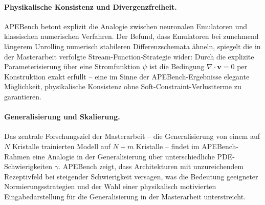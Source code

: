 \documentclass[a4paper,12pt]{article}
\begin{document}
\paragraph{Physikalische Konsistenz und Divergenzfreiheit.}
APEBench betont explizit die Analogie zwischen neuronalen Emulatoren und klassischen numerischen Verfahren. Der Befund, dass Emulat\-oren bei zunehmend längerem Unrolling numerisch stabileren Differenzschemata ähneln, spiegelt die in der Masterarbeit verfolgte Stream-Function-Strategie wider: Durch die explizite Parameterisierung über eine Stromfunktion $\psi$ ist die Bedingung $\nabla \cdot \mathbf{v} = 0$ per Konstruktion exakt erfüllt -- eine im Sinne der APEBench-Ergebnisse elegante Möglichkeit, physikalische Konsistenz ohne Soft-Constraint-Verlustterme zu garantieren.

\paragraph{Generalisierung und Skalierung.}
Das zentrale Forschungsziel der Masterarbeit -- die Generalisierung von einem auf $N$ Kristalle trainierten Modell auf $N+m$ Kristalle -- findet im APEBench-Rahmen eine Analogie in der Generalisierung über unterschiedliche PDE-Schwierigkeiten $\gamma$. APEBench zeigt, dass Architekturen mit unzureichendem Rezeptivfeld bei steigender Schwierigkeit versagen, was die Bedeutung geeigneter Normierungsstrategien und der Wahl einer physikalisch motivierten Eingabedarstellung für die Generalisierung in der Masterarbeit unterstreicht.
\end{document}
